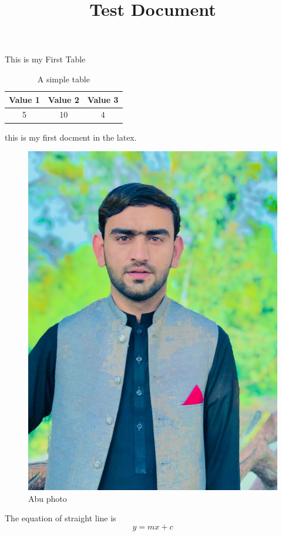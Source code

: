 \documentclass{article}
\begin{document}
\title{Test Document}
\maketitle

This is my First Table
\begin{table}
\caption{A simple table}
\center
\begin{tabular}{c c c}
Value 1 & Value 2 & Value 3\\
\hline
5 & 10 & 4\\
\hline
\end{tabular}

\end{table}

this is my first docment in the latex.
\begin{figure}[h!]
\center
\includegraphics[width=\linewidth] {abu.jpeg}
\caption{Abu photo}
\end{figure}
The equation of straight line is 
\begin{equation}
y=mx+c
\label{eq1}
\end{equation}
\end{document}
